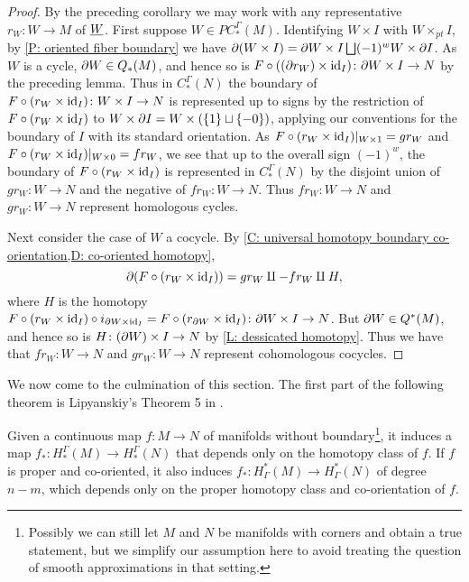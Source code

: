 \begin{proof}
	By the preceding corollary we may work with any representative $r_W \colon W \to M$ of $\underline{W}$.
	First suppose $W \in PC_*^\Gamma(M)$.
	Identifying $W \times I$ with $W \times_{pt} I$, by \cref{P: oriented fiber boundary} we have $\partial (W \times I) = \partial W \times I \bigsqcup (-1)^{w} W \times \partial I$.
	As $W$ is a cycle, $\partial W \in Q_*(M)$, and hence so is $F \circ ((\partial r_W) \times \mathrm{id}_I) \colon \partial W \times I \to N$ by the preceding lemma.
	Thus in $C^\Gamma_*(N)$ the boundary of $F \circ (r_W \times \mathrm{id}_I) \colon W \times I \to N$ is represented up to signs by the restriction of
	$F \circ (r_W \times \mathrm{id}_I)$ to $W \times \partial I = W \times (\{1\} \sqcup \{-0\})$, applying our conventions for the boundary of $I$ with its standard orientation.
	As $F \circ (r_W \times \mathrm{id}_I)|_{W \times 1} = gr_W$ and $F \circ (r_W \times \mathrm{id}_I)|_{W \times 0} = fr_W$, we see that up to the overall sign $(-1)^{w}$, the boundary of $F \circ (r_W \times \mathrm{id}_I)$ is represented in $C_*^\Gamma(N)$ by the disjoint union of $gr_W \colon W \to N$ and the negative of $fr_W \colon W \to N$.
	Thus $fr_W \colon W \to N$ and $gr_W \colon W \to N$ represent homologous cycles.

	Next consider the case of $W$ a cocycle. By \cref{C: universal homotopy boundary co-orientation,D: co-oriented homotopy}, $$\partial (F \circ (r_W \times \mathrm{id}_I)) = gr_W \amalg -fr_W \amalg H,$$ where $H$ is the homotopy $F \circ (r_W \times \mathrm{id}_I) \circ i_{\partial W \times \mathrm{id}_I} = F \circ (r_{\partial W} \times \mathrm{id}_I) \colon \partial W \times I \to N$.
	But $\partial W \in Q^*(M)$, and hence so is $H \colon (\partial W) \times I \to N$ by \cref{L: dessicated homotopy}.
	Thus we have
	that $fr_W \colon W \to N$ and $gr_W \colon W \to N$ represent cohomologous cocycles.
\end{proof}

We now come to the culmination of this section. 
The first part of the following theorem is Lipyanskiy's Theorem 5 in \cite{Lipy14}.

\begin{theorem}\label{T: homology homotopy functor}
	Given a \textnormal{continuous} map $f \colon M \to N$ of manifolds without boundary\footnote{Possibly we can still let $M$ and $N$ be manifolds with corners and obtain a true statement, but we simplify our assumption here to avoid treating the question of smooth approximations in that setting.}, it induces a map $f_* \colon H_*^\Gamma(M) \to H_*^\Gamma(N)$ that depends only on the homotopy class of $f$.
	If $f$ is proper and co-oriented, it also induces $f_* \colon H^*_\Gamma(M) \to H^*_\Gamma(N)$ of degree $n-m$, which depends only on the proper homotopy class and co-orientation of $f$.
\end{theorem}

